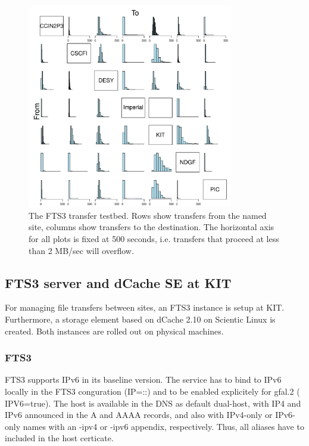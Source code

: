 \begin{figure}[h]
 \centering
   \includegraphics[width=0.8\textwidth]{fts3-mesh.pdf}
       \caption{The FTS3 transfer testbed. Rows show transfers from the named site, columns show transfers to the destination. The horizontal axis for all plots is fixed at 500 seconds, i.e. transfers that proceed at less than 2 MB/sec will overflow.}
 \label{fig:fts3-mesh}
\end{figure}


\subsection{FTS3 server and dCache SE at KIT}
For managing file transfers between sites, an FTS3 instance is setup at KIT. Furthermore, a storage element based on dCache 2.10 on Scientic Linux is created. Both instances are rolled out on physical machines.

\subsubsection{FTS3}
FTS3 supports IPv6 in its baseline version. The service has to bind to IPv6 locally in the FTS3 conguration (IP=::) and to be enabled explicitely for gfal.2 ( IPV6=true). The host is available in the DNS as default dual-host, with IP4 and IPv6 announced in the A and AAAA records, and also with IPv4-only or IPv6-only names with an -ipv4 or -ipv6 appendix, respectively. Thus, all aliases have to included in the host certicate.

